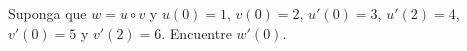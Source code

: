 \item Suponga que $w = u \circ v$ y $u(0) = 1$, $v(0) = 2$, $u'(0) = 3$, $u'(2) = 4$, $v'(0) = 5$ y $v'(2) = 6$. Encuentre $w'(0)$.

